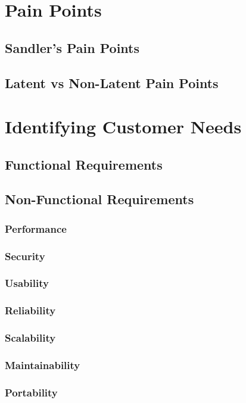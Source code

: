\section{Pain Points}\mbox{}
    \subsection{Sandler's Pain Points}\mbox{}
    \subsection{Latent vs Non-Latent Pain Points}\mbox{}

\section{Identifying Customer Needs}\mbox{}
    \subsection{Functional Requirements}\mbox{}
    \subsection{Non-Functional Requirements}\mbox{}
        \subsubsection{Performance}\mbox{}
        \subsubsection{Security}\mbox{}
        \subsubsection{Usability}\mbox{}
        \subsubsection{Reliability}\mbox{}
        \subsubsection{Scalability}\mbox{}
        \subsubsection{Maintainability}\mbox{}
        \subsubsection{Portability}\mbox{}
